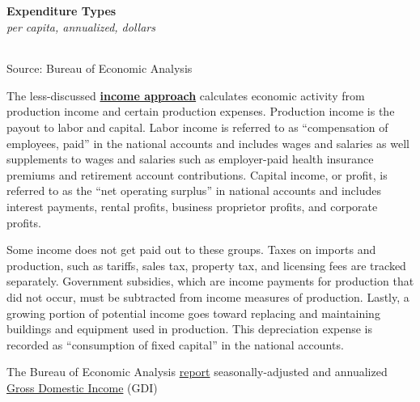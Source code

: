 \documentclass{report}
\begin{document}
\begin{minipage}{0.77\textwidth}
\normalsize \textbf{Expenditure Types}\\
\footnotesize{\textit{per capita, annualized, dollars}}\\
\hspace{-2mm}  \setlength{\tabcolsep}{3.7pt} \color{black!90}
		{\renewcommand{\arraystretch}{1.55}
		 \begin{tabular}{p{53mm} R{13mm} R{13mm} R{13mm} R{13mm}}
			 \hline
		\end{tabular}} \vspace{-2mm}
		
\footnotesize{Source: Bureau of Economic Analysis}
\end{minipage}
\newpage
\begin{minipage}{0.76\textwidth}
\small The less-discussed \textbf{\href{https://www.bea.gov/help/glossary/income-approach}{income approach}} calculates economic activity from production income and certain production expenses. Production income is the payout to labor and capital. Labor income is referred to as ``compensation of employees, paid'' in the national accounts and includes wages and salaries as well supplements to wages and salaries such as employer-paid health insurance premiums and retirement account contributions. Capital income, or profit, is referred to as the ``net operating surplus'' in national accounts and includes interest payments, rental profits, business proprietor profits, and corporate profits.

Some income does not get paid out to these groups. Taxes on imports and production, such as tariffs, sales tax, property tax, and licensing fees are tracked separately. Government subsidies, which are income payments for production that did not occur, must be subtracted from income measures of production. Lastly, a growing portion of potential income goes toward replacing and maintaining buildings and equipment used in production. This depreciation expense is recorded as ``consumption of fixed capital'' in the national accounts.

The Bureau of Economic Analysis \href{https://www.bea.gov/data/gdp/gross-domestic-product}{report} seasonally-adjusted and annualized \href{https://www.bea.gov/help/glossary/gross-domestic-income-gdi}{Gross Domestic Income} (GDI) 
\end{minipage}
\vspace{1mm}
\end{document}
